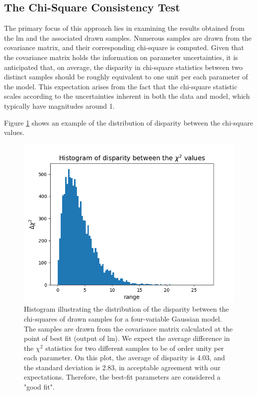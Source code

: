 \documentclass[12pt, TexShade, letterpaper]{report}
\begin{document}
\subsection{The Chi-Square Consistency Test}
\label{chap:method,sub:test,subsub:chi}
The primary focus of this approach lies in examining the results obtained from the \gls{lm} and the associated drawn samples. Numerous samples are drawn from the covariance matrix, and their corresponding chi-square is computed. Given that the covariance matrix holds the information on parameter uncertainties, it is anticipated that, on average, the disparity in chi-square statistics between two distinct samples should be roughly equivalent to one unit per each parameter of the model. This expectation arises from the fact that the chi-square statistic scales according to the uncertainties inherent in both the data and model, which typically have magnitudes around 1.\par
Figure \ref{fig:csq_test} shows an example of the distribution of disparity between the chi-square values.\par
\begin{figure}[h!]
\centering
\includegraphics[scale =0.8]{csq_hist.png}
\caption[Histogram of disparity in the chi-square values of drawn samples]{Histogram illustrating the distribution of the disparity between the chi-squares of drawn samples for a four-variable Gaussian model. The samples are drawn from the covariance matrix calculated at the point of best fit (output of \gls{lm}). We expect the average difference in the $\chi^2$ statistics for two different samples to be of order unity per each parameter.
On this plot, the average of disparity is 4.03, and the standard deviation is 2.83, in acceptable agreement with our expectations. Therefore, the best-fit parameters are considered a "good fit".}
\label{fig:csq_test}
\end{figure}
\end{document}

